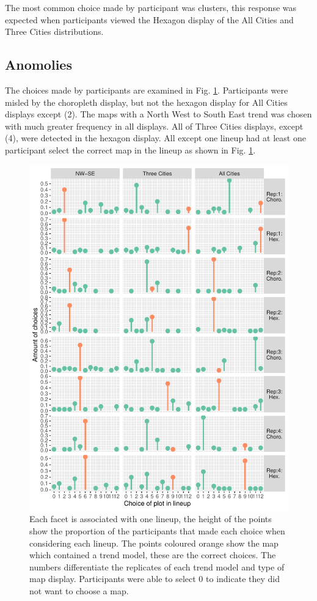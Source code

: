 \documentclass[conference,final,]{IEEEtran}
\makeatletter
\def\maxwidth{\ifdim\Gin@nat@width>\linewidth\linewidth
\else\Gin@nat@width\fi}
\let\Oldincludegraphics\includegraphics
\renewcommand{\includegraphics}[1]{\Oldincludegraphics[width=\maxwidth]{#1}}
\makeatother
\begin{document}
The most common choice made by participant was clusters, this response was expected when participants viewed the Hexagon display of the All Cities and Three Cities distributions.

\hypertarget{anomolies}{%
\subsection{Anomolies}\label{anomolies}}

The choices made by participants are examined in Fig. \ref{fig:choices}.
Participants were misled by the choropleth display, but not the hexagon display for All Cities displays except (2). The maps with a North West to South East trend was chosen with much greater frequency in all displays. All of Three Cities displays, except (4), were detected in the hexagon display. All except one lineup had at least one participant select the correct map in the lineup as shown in Fig. \ref{fig:choices}.

\begin{figure}
\centering
\includegraphics{paper_files/figure-latex/choices-1.pdf}
\caption{\label{fig:choices}Each facet is associated with one lineup, the height of the points show the proportion of the participants that made each choice when considering each lineup. The points coloured orange show the map which contained a trend model, these are the correct choices. The numbers differentiate the replicates of each trend model and type of map display. Participants were able to select 0 to indicate they did not want to choose a map.}
\end{figure}
\end{document}
